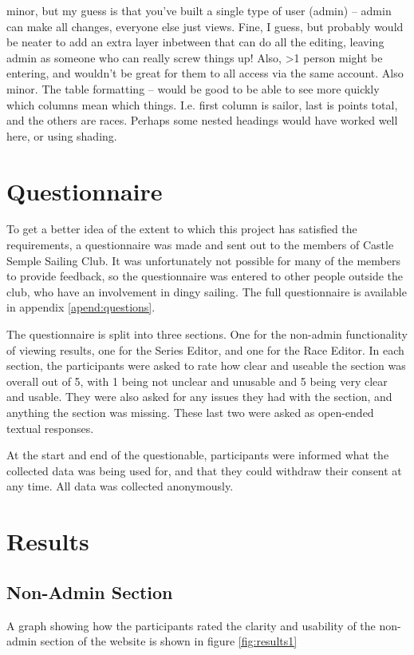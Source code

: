 \documentclass{l4proj}
\begin{document}
\begin{displayquote}
\begin{outline}
        \1 
        minor, but my guess is that you've built a single type of user (admin) -- admin can make all changes, everyone else just views. Fine, I guess, but probably would be neater to add an extra layer inbetween that can do all the editing, leaving admin as someone who can really screw things up! Also, >1 person might be entering, and wouldn't be great for them to all access via the same account.
        \1 
        Also minor. The table formatting -- would be good to be able to see more quickly which columns mean which things. I.e. first column is sailor, last is points total, and the others are races. Perhaps some nested headings would have worked well here, or using shading.
    \end{outline}
\end{displayquote}

\section{Questionnaire}

To get a better idea of the extent to which this project has satisfied the requirements, a questionnaire was made and sent out to the members of Castle Semple Sailing Club. It was unfortunately not possible for many of the members to provide feedback, so the questionnaire was entered to other people outside the club, who have an involvement in dingy sailing. The full questionnaire is available in appendix \ref{apend:questions}.

The questionnaire is split into three sections. One for the non-admin functionality of viewing results, one for the Series Editor, and one for the Race Editor. In each section, the participants were asked to rate how clear and useable the section was overall out of 5, with 1 being not unclear and unusable and 5 being very clear and usable. They were also asked for any issues they had with the section, and anything the section was missing. These last two were asked as open-ended textual responses.

At the start and end of the questionable, participants were informed what the collected data was being used for, and that they could withdraw their consent at any time. All data was collected anonymously.

\section{Results}

\subsection{Non-Admin Section}
A graph showing how the participants rated the clarity and usability of the non-admin section of the website is shown in figure \ref{fig:results1}
\end{document}
